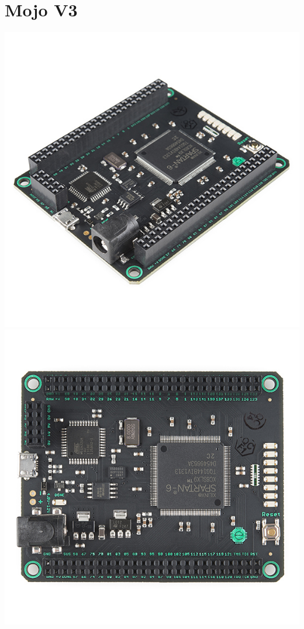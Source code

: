 \documentclass{article}
\begin{document}
	\section{Mojo V3}
	\includegraphics[scale=0.35]{mojo1}
	\includegraphics[scale=0.35]{mojo2}
\end{document}
